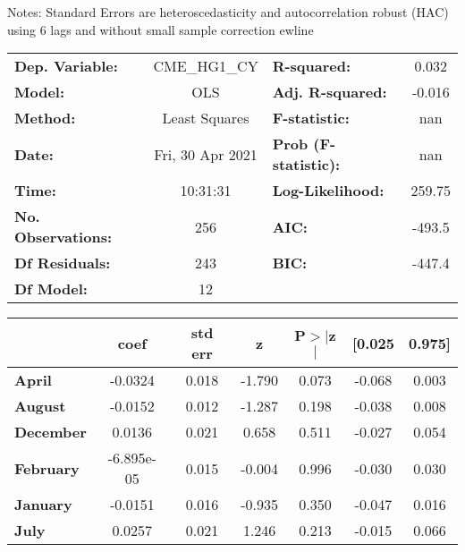Notes: \newline
 [1] Standard Errors are heteroscedasticity and autocorrelation robust (HAC) using 6 lags and without small sample correction
ewline\begin{center}
\begin{tabular}{lclc}
\toprule
\textbf{Dep. Variable:}    &   CME\_HG1\_CY   & \textbf{  R-squared:         } &     0.032   \\
\textbf{Model:}            &       OLS        & \textbf{  Adj. R-squared:    } &    -0.016   \\
\textbf{Method:}           &  Least Squares   & \textbf{  F-statistic:       } &       nan   \\
\textbf{Date:}             & Fri, 30 Apr 2021 & \textbf{  Prob (F-statistic):} &      nan    \\
\textbf{Time:}             &     10:31:31     & \textbf{  Log-Likelihood:    } &    259.75   \\
\textbf{No. Observations:} &         256      & \textbf{  AIC:               } &    -493.5   \\
\textbf{Df Residuals:}     &         243      & \textbf{  BIC:               } &    -447.4   \\
\textbf{Df Model:}         &          12      & \textbf{                     } &             \\
\bottomrule
\end{tabular}
\begin{tabular}{lcccccc}
                   & \textbf{coef} & \textbf{std err} & \textbf{z} & \textbf{P$> |$z$|$} & \textbf{[0.025} & \textbf{0.975]}  \\
\midrule
\textbf{April}     &      -0.0324  &        0.018     &    -1.790  &         0.073        &       -0.068    &        0.003     \\
\textbf{August}    &      -0.0152  &        0.012     &    -1.287  &         0.198        &       -0.038    &        0.008     \\
\textbf{December}  &       0.0136  &        0.021     &     0.658  &         0.511        &       -0.027    &        0.054     \\
\textbf{February}  &   -6.895e-05  &        0.015     &    -0.004  &         0.996        &       -0.030    &        0.030     \\
\textbf{January}   &      -0.0151  &        0.016     &    -0.935  &         0.350        &       -0.047    &        0.016     \\
\textbf{July}      &       0.0257  &        0.021     &     1.246  &         0.213        &       -0.015    &        0.066     \\

\end{tabular}
\end{center}
